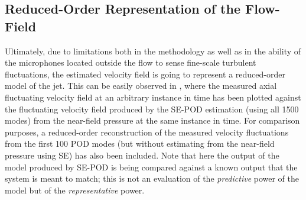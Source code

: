\subsection{Reduced-Order Representation of the Flow-Field}
Ultimately, due to limitations both in the methodology as well as in the ability of the microphones located outside the flow to sense fine-scale turbulent fluctuations, the estimated velocity field is going to represent a reduced-order model of the jet.
This can be easily observed in , where the measured axial fluctuating velocity field at an arbitrary instance in time has been plotted against the fluctuating velocity field produced by the SE-POD estimation (using all 1500 modes) from the near-field pressure at the same instance in time.
For comparison purposes, a reduced-order reconstruction of the measured velocity fluctuations from the first 100 POD modes (but without estimating from the near-field pressure using SE) has also been included.
Note that here the output of the model produced by SE-POD is being compared against a known output that the system is meant to match; this is not an evaluation of the \textit{predictive} power of the model but of the \textit{representative} power.
